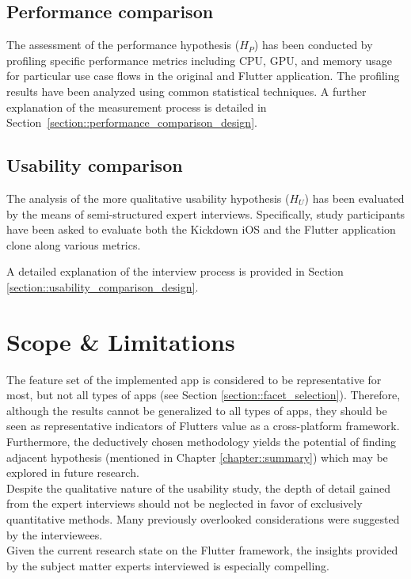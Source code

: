 \subsection{Performance comparison}
The assessment of the performance hypothesis ($H_P$) has been conducted by profiling specific performance metrics including CPU, GPU, and memory usage 
for particular use case flows in the original and Flutter application. 
The profiling results have been analyzed using common statistical techniques.
A further explanation of the measurement process is detailed in Section~\ref{section::performance_comparison_design}.

\subsection{Usability comparison}
The analysis of the more qualitative usability hypothesis ($H_U$) has been evaluated by the means of semi-structured expert interviews.
Specifically, study participants have been asked to evaluate both the Kickdown iOS and the Flutter application clone along various metrics.

A detailed explanation of the interview process is provided in Section \ref{section::usability_comparison_design}.

\section{Scope \& Limitations}
The feature set of the implemented app is considered to be representative for most, but not all types of apps (see Section \ref{section::facet_selection}). 
Therefore, although the results cannot be generalized to all types of apps, they should be seen as representative indicators of Flutters value as a cross-platform framework. 
Furthermore, the deductively chosen methodology yields the potential of finding adjacent hypothesis (mentioned in Chapter \ref{chapter::summary}) which may be
explored in future research.\\
Despite the qualitative nature of the usability study, the depth of detail gained from the expert interviews
should not be neglected in favor of exclusively quantitative methods. Many previously overlooked considerations were suggested by the interviewees.\\
Given the current research state on the Flutter framework, the insights provided by the subject matter  experts interviewed is especially compelling.


